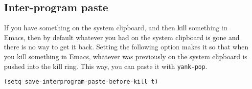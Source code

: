 \documentclass[11pt]{article}
\begin{document}
\subsection{Inter-program paste}
\label{sec:org08c7c7b}
If you have something on the system clipboard, and then kill something
in Emacs, then by default whatever you had on the system clipboard is
gone and there is no way to get it back. Setting the following option
makes it so that when you kill something in Emacs, whatever was
previously on the system clipboard is pushed into the kill ring. This
way, you can paste it with \texttt{yank-pop}.
\begin{verbatim}
(setq save-interprogram-paste-before-kill t)
\end{verbatim}
\end{document}

